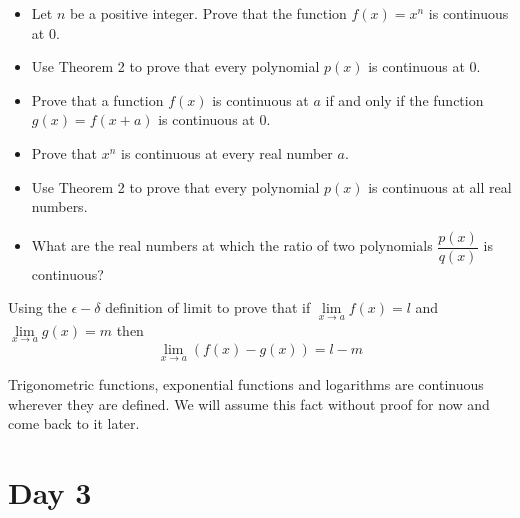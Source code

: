 \documentclass[9pt, a4paper, oneside]{amsart}
\begin{document}
\begin{questions}[resume]
	\item
	\begin{itemize}
		\item Let $ n$ be a positive integer. Prove that the function $f(x)=x^n$ is continuous at 0.

		\item Use Theorem 2 to prove that every polynomial $p(x)$ is continuous at 0.

		\item Prove that a function $ f(x)$ is continuous at $a$ if and only if the function $ g(x) = f(x + a)$ is continuous at $0$.

		\item Prove that $x^n$ is continuous at every real number $ a$.

		\item Use Theorem 2 to prove that every polynomial $p(x)$ is continuous at all real numbers.

		\item What are the real numbers at which the ratio of two polynomials $\dfrac{p(x)}{q(x)}$ is continuous?
	\end{itemize}


	\item Using the $\epsilon-\delta$ definition of limit to prove that if $\lim \limits _ {x \rightarrow a} f(x) = l$ and $\lim \limits _ {x \rightarrow a} g(x) = m$ then $$\lim \limits _ {x \rightarrow a} \left(f(x)- g(x)\right) = l-m$$
	

\end{questions}
Trigonometric functions, exponential functions and logarithms are continuous wherever they are defined. We will assume this fact without proof for now and come back to it later.











\newpage\section*{Day 3}
\end{document}
